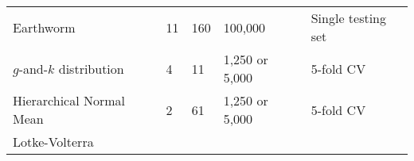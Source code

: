 \documentclass[]{article}
\begin{document}
\begin{longtable}[]{@{}lllll@{}}
\begin{minipage}[t]{0.20\columnwidth}
Earthworm\strut
\end{minipage} & \begin{minipage}[t]{0.15\columnwidth}\raggedright
11\strut
\end{minipage} & \begin{minipage}[t]{0.21\columnwidth}\raggedright
160\strut
\end{minipage} & \begin{minipage}[t]{0.15\columnwidth}\raggedright
100,000\strut
\end{minipage} & \begin{minipage}[t]{0.15\columnwidth}\raggedright
Single testing set\strut
\end{minipage}\tabularnewline
\begin{minipage}[t]{0.20\columnwidth}\raggedright
\(g\)-and-\(k\) distribution\strut
\end{minipage} & \begin{minipage}[t]{0.15\columnwidth}\raggedright
4\strut
\end{minipage} & \begin{minipage}[t]{0.21\columnwidth}\raggedright
11\strut
\end{minipage} & \begin{minipage}[t]{0.15\columnwidth}\raggedright
1,250 or 5,000\strut
\end{minipage} & \begin{minipage}[t]{0.15\columnwidth}\raggedright
5-fold CV\strut
\end{minipage}\tabularnewline
\begin{minipage}[t]{0.20\columnwidth}\raggedright
Hierarchical Normal Mean\strut
\end{minipage} & \begin{minipage}[t]{0.15\columnwidth}\raggedright
2\strut
\end{minipage} & \begin{minipage}[t]{0.21\columnwidth}\raggedright
61\strut
\end{minipage} & \begin{minipage}[t]{0.15\columnwidth}\raggedright
1,250 or 5,000\strut
\end{minipage} & \begin{minipage}[t]{0.15\columnwidth}\raggedright
5-fold CV\strut
\end{minipage}\tabularnewline
\begin{minipage}[t]{0.20\columnwidth}\raggedright
Lotke-Volterra\strut
\end{minipage} & \begin{minipage}[t]{0.15\columnwidth}\raggedright

\end{minipage}
\end{longtable}
\end{document}
